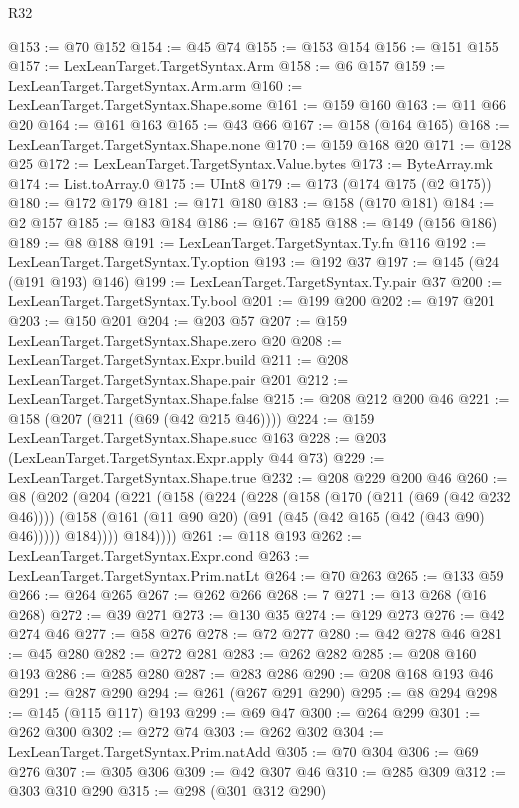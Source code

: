 \begin{lexlean}{R32}
\begin{coremodule}
@153 := @70 @152
@154 := @45 @74
@155 := @153 @154
@156 := @151 @155
@157 := LexLeanTarget.TargetSyntax.Arm
@158 := @6 @157
@159 := LexLeanTarget.TargetSyntax.Arm.arm
@160 := LexLeanTarget.TargetSyntax.Shape.some
@161 := @159 @160
@163 := @11 @66 @20
@164 := @161 @163
@165 := @43 @66
@167 := @158 (@164 @165)
@168 := LexLeanTarget.TargetSyntax.Shape.none
@170 := @159 @168 @20
@171 := @128 @25
@172 := LexLeanTarget.TargetSyntax.Value.bytes
@173 := ByteArray.mk
@174 := List.toArray.{0}
@175 := UInt8
@179 := @173 (@174 @175 (@2 @175))
@180 := @172 @179
@181 := @171 @180
@183 := @158 (@170 @181)
@184 := @2 @157
@185 := @183 @184
@186 := @167 @185
@188 := @149 (@156 @186)
@189 := @8 @188
@191 := LexLeanTarget.TargetSyntax.Ty.fn @116
@192 := LexLeanTarget.TargetSyntax.Ty.option
@193 := @192 @37
@197 := @145 (@24 (@191 @193) @146)
@199 := LexLeanTarget.TargetSyntax.Ty.pair @37
@200 := LexLeanTarget.TargetSyntax.Ty.bool
@201 := @199 @200
@202 := @197 @201
@203 := @150 @201
@204 := @203 @57
@207 := @159 LexLeanTarget.TargetSyntax.Shape.zero @20
@208 := LexLeanTarget.TargetSyntax.Expr.build
@211 := @208 LexLeanTarget.TargetSyntax.Shape.pair @201
@212 := LexLeanTarget.TargetSyntax.Shape.false
@215 := @208 @212 @200 @46
@221 := @158 (@207 (@211 (@69 (@42 @215 @46))))
@224 := @159 LexLeanTarget.TargetSyntax.Shape.succ @163
@228 := @203 (LexLeanTarget.TargetSyntax.Expr.apply @44 @73)
@229 := LexLeanTarget.TargetSyntax.Shape.true
@232 := @208 @229 @200 @46
@260 := @8
    (@202
      (@204
        (@221
          (@158
            (@224
              (@228
                (@158
                  (@170 (@211 (@69 (@42 @232 @46))))
                  (@158 (@161 (@11 @90 @20) (@91 (@45 (@42 @165 (@42 (@43 @90) @46))))) @184))))
            @184))))
@261 := @118 @193
@262 := LexLeanTarget.TargetSyntax.Expr.cond
@263 := LexLeanTarget.TargetSyntax.Prim.natLt
@264 := @70 @263
@265 := @133 @59
@266 := @264 @265
@267 := @262 @266
@268 := 7
@271 := @13 @268 (@16 @268)
@272 := @39 @271
@273 := @130 @35
@274 := @129 @273
@276 := @42 @274 @46
@277 := @58 @276
@278 := @72 @277
@280 := @42 @278 @46
@281 := @45 @280
@282 := @272 @281
@283 := @262 @282
@285 := @208 @160 @193
@286 := @285 @280
@287 := @283 @286
@290 := @208 @168 @193 @46
@291 := @287 @290
@294 := @261 (@267 @291 @290)
@295 := @8 @294
@298 := @145 (@115 @117) @193
@299 := @69 @47
@300 := @264 @299
@301 := @262 @300
@302 := @272 @74
@303 := @262 @302
@304 := LexLeanTarget.TargetSyntax.Prim.natAdd
@305 := @70 @304
@306 := @69 @276
@307 := @305 @306
@309 := @42 @307 @46
@310 := @285 @309
@312 := @303 @310 @290
@315 := @298 (@301 @312 @290)

\end{coremodule}
\end{lexlean}
